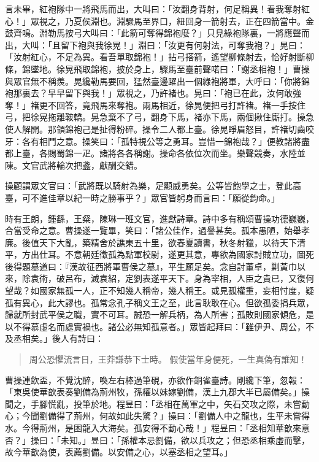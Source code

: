 言未畢，紅袍隊中一將飛馬而出，大叫曰：「汝翻身背射，何足稱異！看我奪射紅心！」眾視之，乃夏侯淵也。淵驟馬至界口，紐回身一箭射去，正在四箭當中。金鼓齊鳴。淵勒馬按弓大叫曰：「此箭可奪得錦袍麼？」只見綠袍隊裏，一將應聲而出，大叫：「且留下袍與我徐晃！」淵曰：「汝更有何射法，可奪我袍？」晃曰：「汝射紅心，不足為異。看吾單取錦袍！」拈弓搭箭，遙望柳條射去，恰好射斷柳條，錦墜地。徐晃飛取錦袍，披於身上，驟馬至臺前聲喏曰：「謝丞相袍！」曹操與眾官無不稱羨。晃纔勒馬要回，猛然臺邊躍出一個綠袍將軍，大呼曰：「你將錦袍那裏去？早早留下與我！」眾視之，乃許褚也。晃曰：「袍已在此，汝何敢強奪！」褚更不回答，竟飛馬來奪袍。兩馬相近，徐晃便把弓打許褚。褚一手按住弓，把徐晃拖離鞍轎。晃急棄不了弓，翻身下馬，褚亦下馬，兩個揪住廝打。操急使人解開。那領錦袍己是扯得粉碎。操令二人都上臺。徐晃睜眉怒目，許褚切齒咬牙：各有相鬥之意。操笑曰：「孤特視公等之勇耳。豈惜一錦袍哉？」便教諸將盡都上臺，各賜蜀錦一疋。諸將各各稱謝。操命各依位次而坐。樂聲競奏，水陸並陳。文官武將輪次把盞，獻酬交錯。

操顧謂眾文官曰：「武將既以騎射為樂，足顯威勇矣。公等皆飽學之士，登此高臺，可不進佳章以紀一時之勝事乎？」眾官皆躬身而言曰：「願從鈞命。」

時有王朗，鍾繇，王粲，陳琳一班文官，進獻詩章。詩中多有稱頌曹操功德巍巍，合當受命之意。曹操遂一覽畢，笑曰：「諸公佳作，過譽甚矣。孤本愚陋，始舉孝廉。後值天下大亂，築精舍於譙東五十里，欲春夏讀書，秋冬射獵，以待天下清平，方出仕耳。不意朝廷徵孤為點軍校尉，遂更其意，專欲為國家討賊立功，圖死後得題墓道曰：『漢故征西將軍曹侯之墓』，平生願足矣。念自討董卓，剿黃巾以來，除袁術，破呂布，滅袁紹，定劉表遂平天下。身為宰相，人臣之貴已，又復何望哉？如國家無孤一人，正不知幾人稱帝，幾人稱王。或見孤權重，妄相忖度，疑孤有異心，此大謬也。孤常念孔子稱文王之至，此言耿耿在心。但欲孤委捐兵眾，歸就所封武平侯之職，實不可耳。誠恐一解兵柄，為人所害；孤敗則國家傾危，是以不得慕虛名而處實禍也。諸公必無知孤意者。」眾皆起拜曰：「雖伊尹、周公，不及丞相矣。」後人有詩曰：

\begin{quote}
周公恐懼流言日，王莽謙恭下士時。
假使當年身便死，一生真偽有誰知！
\end{quote}

曹操連飲盃，不覺沈醉，喚左右棒過筆硯，亦欲作銅雀臺詩。剛纔下筆，忽報：「東吳使華歆表奏劉備為荊州牧，孫權以妹嫁劉備，漢上九郡大半已屬備矣。」操聞之，手腳慌亂，投筆於地。程昱曰：「丞相在萬軍之中，矢石交攻之際，未嘗動心；今聞劉備得了荊州，何故如此失驚？」操曰：「劉備人中之龍也，生平未嘗得水。今得荊州，是困龍入大海矣。孤安得不動心哉！」程昱曰：「丞相知華歆來意否？」操曰：「未知。」昱曰：「孫權本忌劉備，欲以兵攻之；但恐丞相乘虛而擊，故今華歆為使，表薦劉備。以安備之心，以塞丞相之望耳。」

